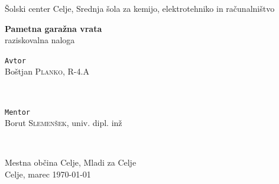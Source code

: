 \documentclass[11pt]{article}
\begin{document}
\renewcommand{\theFancyVerbLine}{
  \sffamily\textcolor[rgb]{0.5,0.5,0.5}{\scriptsize\arabic{FancyVerbLine}}}

\begin{titlepage}
\thispagestyle{empty}
   \center
   \fancyhead{}
   \large{Šolski center Celje, Srednja šola za kemijo, elektrotehniko in računalništvo}\\[1.5cm]
   \vspace*{\fill}
   \begin{center}
   \Huge{\bfseries Pametna garažna vrata}\\
   \vspace{1mm}
   \large{raziskovalna naloga}
   \end{center}
   \vspace*{\fill}

	\begin{minipage}{0.4\textwidth}
		\begin{flushleft}
		\vspace{4.5mm}
			\large
			\texttt{Avtor}\\
			Boštjan \textsc{Planko}, R-4.A \\ %
		\end{flushleft}
	\end{minipage}
	~
	\begin{minipage}{0.5\textwidth}
		\begin{flushright}
			\large
			\texttt{Mentor}\\
			Borut \textsc{Slemenšek},  univ. dipl. inž %
		\end{flushright}
	\end{minipage}
	~
	\begin{minipage}{0.5\textwidth}
		\begin{center}
		    \vspace{5mm}
		    Mestna občina Celje, Mladi za Celje\\
			\large{Celje, marec \monthyeardate\today}
		\end{center}
	\end{minipage}
	\fancyfoot{}
\end{titlepage}
\end{document}
